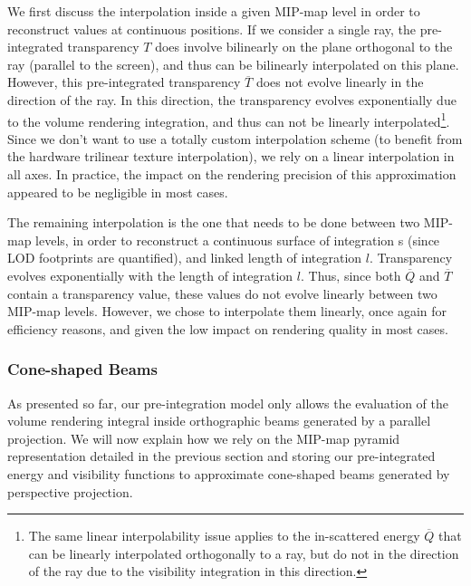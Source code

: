 We first discuss the interpolation inside a given MIP-map level in order to reconstruct values at continuous positions. If we consider a single ray, the pre-integrated transparency $T$ does involve bilinearly on the plane orthogonal to the ray (parallel to the screen), and thus can be bilinearly interpolated on this plane. However, this pre-integrated transparency $\overline{T}$ does not evolve linearly in the direction of the ray. In this direction, the transparency evolves exponentially due to the volume rendering integration, and thus can not be linearly interpolated\footnote{The same linear interpolability issue applies to the in-scattered energy $\overline{Q}$ that can be linearly interpolated orthogonally to a ray, but do not in the direction of the ray due to the visibility integration in this direction.}. Since we don't want to use a totally custom interpolation scheme (to benefit from the hardware trilinear texture interpolation), we rely on a linear interpolation in all axes. In practice, the impact on the rendering precision of this approximation appeared to be negligible in most cases.

The remaining interpolation is the one that needs to be done between two MIP-map levels, in order to reconstruct a continuous surface of integration s (since LOD footprints are quantified), and linked length of integration $l$. Transparency evolves exponentially with the length of integration $l$. Thus, since both $\overline{Q}$ and $\overline{T}$ contain a transparency value, these values do not evolve linearly between two MIP-map levels. However, we chose to interpolate them linearly, once again for efficiency reasons, and given the low impact on rendering quality in most cases.





\subsubsection{Cone-shaped Beams}
As presented so far, our pre-integration model only allows the evaluation of the volume rendering integral inside orthographic beams generated by a parallel projection. We will now explain how we rely on the MIP-map pyramid representation detailed in the previous section and storing our pre-integrated energy and visibility functions to approximate cone-shaped beams generated by perspective projection.

